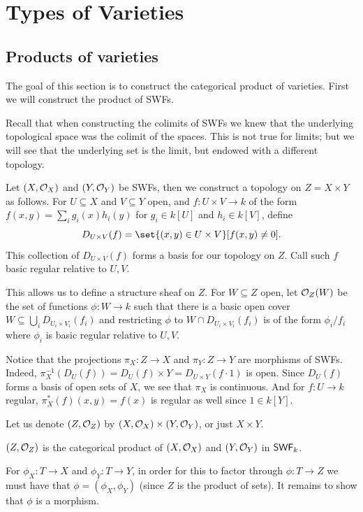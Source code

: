 \section{Types of Varieties}

\subsection{Products of varieties}

The goal of this section is to construct the categorical product of varieties.
First we will construct the product of SWFs.

Recall that when constructing the colimits of SWFs we knew that the underlying topological space was the colimit of the spaces.
This is not true for limits; but we will see that the underlying set is the limit, but endowed with a different topology.

Let $(X,{{\cal O}}_X)$ and $(Y,{{\cal O}}_Y)$ be SWFs, then we construct a topology on $Z=X\times Y$ as follows.
For $U\subseteq X$ and $V\subseteq Y$ open, and $f\colon U\times V\to k$ of the form $f(x,y)=\sum_ig_i(x)h_i(y)$ for $g_i\in k[U]$
and $h_i\in k[V]$, define
$$ D_{U\times V}(f) = \set{(x,y)\in U\times V}[f(x,y)\neq0] . $$
This collection of $D_{U\times V}(f)$ forms a basis for our topology on $Z$.
Call such $f$ {\emphcolor basic regular} relative to $U,V$.

This allows us to define a structure sheaf on $Z$.
For $W\subseteq Z$ open, let ${{\cal O}}_Z(W)$ be the set of functions $\phi\colon W\to k$ such that there is a basic open cover
$W\subseteq\bigcup_iD_{U_i\times V_i}(f_i)$ and restricting $\phi$ to $W\cap D_{U_i\times V_i}(f_i)$ is of the form $\phi_i/f_i$
where $\phi_i$ is basic regular relative to $U,V$.

Notice that the projections $\pi_X\colon Z\to X$ and $\pi_Y\colon Z\to Y$ are morphisms of SWFs.
Indeed, $\pi_X^{-1}(D_U(f))=D_U(f)\times Y=D_{U\times Y}(f\cdot1)$ is open.
Since $D_U(f)$ forms a basis of open sets of $X$, we see that $\pi_X$ is continuous.
And for $f\colon U\to k$ regular, $\pi^*_X(f)(x,y)=f(x)$ is regular as well since $1\in k[Y]$.

Let us denote $(Z,{{\cal O}}_Z)$ by $(X,{{\cal O}}_X)\times(Y,{{\cal O}}_Y)$, or just $X\times Y$.

\blemm

    $(Z,{{\cal O}}_Z)$ is the categorical product of $(X,{{\cal O}}_X)$ and $(Y,{{\cal O}}_Y)$ in ${\sf SWF}_k$.

\elemm

\bproof

    For $\phi_X\colon T\to X$ and $\phi_Y\colon T\to Y$, in order for this to factor through $\phi\colon T\to Z$ we must have that
    $\phi=(\phi_X,\phi_Y)$ (since $Z$ is the product of sets).
    It remains to show that $\phi$ is a morphism.

